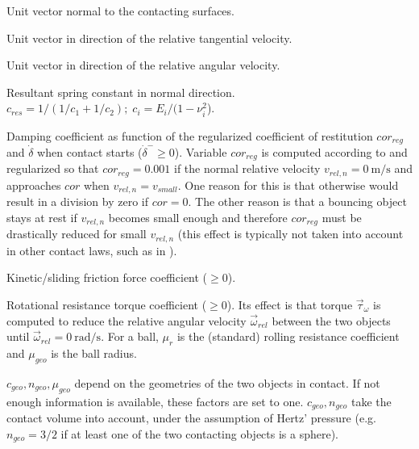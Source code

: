 \begin{description}[labelwidth=3ex]
\item[$\vec{e}_n$] Unit vector normal to the contacting surfaces.
\item[$\vec{e}_t$] Unit vector in direction of the relative tangential velocity.
\item[$\vec{e}_{\omega}$] Unit vector in direction of the relative angular velocity.
\item[$c_{res}(E_1, E_2, \nu_1, \nu_2)$]  Resultant spring constant in normal direction.
                   $c_{res}=1/(1/c_1+1/c_2); \; c_i=E_i/(1 - \nu_i^2$). 

\item[$d(cor_{reg}, \dot{\delta}^{-})$] Damping coefficient as function of the regularized
                   coefficient of restitution $cor_{reg}$ and $\dot{\delta}$
                   when contact starts ($\dot{\delta}^{-} \ge 0$).
                   Variable $cor_{reg}$ is computed according to \cite{Flores2011} and regularized
                   so that $cor_{reg} = 0.001$ if the normal relative velocity $v_{rel,n}=\SI{0}{\meter \per \second}$
                   and approaches $cor$ when $v_{rel,n} = v_{small}$.
                   One reason for this is
                   that otherwise \cite{Flores2011} would result in a division by zero if 
                    $cor =  0$. The other reason is that a bouncing object stays at rest if 
                   $v_{rel,n}$ becomes small enough and therefore $cor_{reg}$ must be drastically
                   reduced for small $v_{rel,n}$ (this effect is typically not taken
                   into account in other contact laws, such as in \cite{Skinjar2018}).
\item[$\mu_k$]     Kinetic/sliding friction force coefficient ($\ge 0$).
\item[$\mu_r$]     Rotational resistance torque coefficient ($\ge 0$). 
                   Its effect is that torque $\vec{\tau}_{\omega}$ is computed to reduce the relative
                   angular velocity $\vec{\omega}_{rel}$ between the two objects until $\vec{\omega}_{rel}= \SI{0}{\radian\per\second}$.
                   For a ball, $\mu_r$ is the (standard) rolling resistance coefficient and
                   $\mu_{geo}$ is the ball radius.
\end{description}
%
$c_{geo}, n_{geo}, \mu_{geo}$ depend on the geometries of the two objects in contact.
If not enough information is available, these factors are set to one.
$c_{geo}, n_{geo}$ take the contact volume into account, under the assumption of Hertz' pressure (e.g.\ $n_{geo} = 3/2$ if at least one of the
two contacting objects is a sphere).

